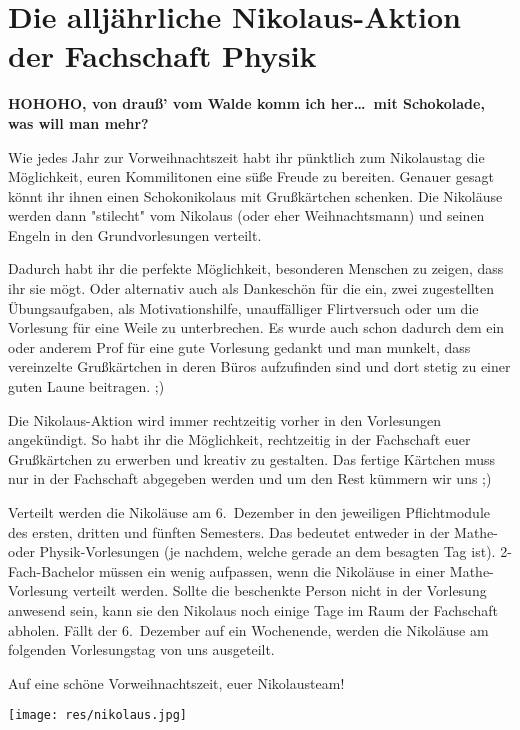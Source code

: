 \section{Die alljährliche Nikolaus-Aktion der Fachschaft Physik}
\begin{multicols}{2}
\textbf{HOHOHO, von drauß' vom Walde komm ich her\dots\
	mit Schokolade, was will man mehr?}

Wie jedes Jahr zur Vorweihnachtszeit habt ihr pünktlich zum Nikolaustag die Möglichkeit, euren Kommilitonen eine süße Freude zu bereiten. Genauer gesagt könnt ihr ihnen einen Schokonikolaus mit Grußkärtchen schenken. 
Die Nikoläuse werden dann "stilecht" vom Nikolaus (oder eher Weihnachtsmann) und seinen Engeln in den Grundvorlesungen verteilt.

Dadurch habt ihr die perfekte Möglichkeit, besonderen Menschen zu zeigen, dass ihr sie mögt. Oder alternativ auch als Dankeschön für die ein, zwei zugestellten Übungsaufgaben, als Motivationshilfe, unauffälliger Flirtversuch oder um die Vorlesung für eine Weile zu unterbrechen. Es wurde auch schon dadurch dem ein oder anderem Prof für eine gute Vorlesung gedankt und man munkelt, dass vereinzelte Grußkärtchen in deren Büros aufzufinden sind und dort stetig zu einer guten Laune beitragen. ;)

Die Nikolaus-Aktion wird immer rechtzeitig vorher in den Vorlesungen angekündigt. So habt ihr die Möglichkeit, rechtzeitig in der Fachschaft euer Grußkärtchen zu erwerben und kreativ zu gestalten. 
Das fertige Kärtchen muss nur in der Fachschaft abgegeben werden und um den Rest kümmern wir uns ;)

Verteilt werden die Nikoläuse am 6.~Dezember in den jeweiligen Pflichtmodule des ersten, dritten und fünften Semesters. Das bedeutet entweder in der Mathe- oder Physik-Vorlesungen (je nachdem, welche gerade an dem besagten Tag ist).
2-Fach-Bachelor müssen ein wenig aufpassen, wenn die Nikoläuse in einer Mathe-Vorlesung verteilt werden.
Sollte die beschenkte Person nicht in der Vorlesung anwesend sein, kann sie den Nikolaus noch einige Tage im Raum der Fachschaft abholen.
Fällt der 6.~Dezember auf ein Wochenende, werden die Nikoläuse am folgenden Vorlesungstag von uns ausgeteilt.

Auf eine schöne Vorweihnachtszeit, euer Nikolausteam!

\end{multicols}

\vspace{\fill}
\begin{center}
	\texttt{[image: res/nikolaus.jpg]}
\end{center}
